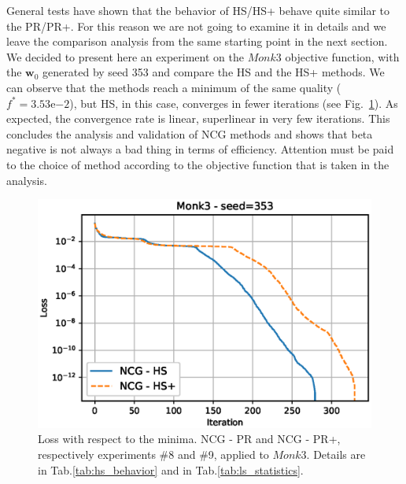 \documentclass[11pt]{article}
\begin{document}
General tests have shown that the behavior of HS/HS+ behave quite similar to the PR/PR+. For this reason we are not going to examine it in details and we leave the comparison analysis from the same starting point in the next section. We decided to present here an experiment on the $Monk3$ objective function, with the $\mathbf{w}_0$ generated by seed 353 and compare the HS and the HS+ methods. We can observe that the methods reach a minimum of the same quality ($f^* = 3.53\mathrm{e}{-2}$), but HS, in this case, converges in fewer iterations (see Fig.~\ref{fig:monk3_hs_hs+}).
As expected, the convergence rate is linear, superlinear in very few iterations.
This concludes the analysis and validation of NCG methods and shows that beta negative is not always a bad thing in terms of efficiency. Attention must be paid to the choice of method according to the objective function that is taken in the analysis. 
\begin{figure}[H]
         \centering
         \includegraphics[scale = 0.6]{Images/monk3_hs_hs+.eps}
         \caption{Loss with respect to the minima. NCG - PR and NCG - PR+, respectively experiments \#8 and \#9, applied to $Monk3$. Details are in Tab.\ref{tab:hs_behavior} and in Tab.\ref{tab:ls_statistics}.}
    \label{fig:monk3_hs_hs+}
\end{figure}
\end{document}
